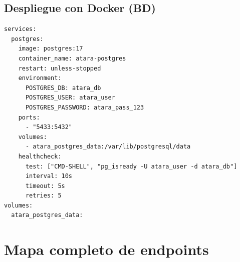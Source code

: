 \documentclass[11pt,a4paper,oneside]{article}
\newcommand{\code}[1]{\texttt{\small #1}}
\begin{document}
\subsection{Despliegue con Docker (BD)}

\begin{lstlisting}[style=bash,caption={\code{docker-compose.yml} de desarrollo}]
services:
  postgres:
    image: postgres:17
    container_name: atara-postgres
    restart: unless-stopped
    environment:
      POSTGRES_DB: atara_db
      POSTGRES_USER: atara_user
      POSTGRES_PASSWORD: atara_pass_123
    ports:
      - "5433:5432"
    volumes:
      - atara_postgres_data:/var/lib/postgresql/data
    healthcheck:
      test: ["CMD-SHELL", "pg_isready -U atara_user -d atara_db"]
      interval: 10s
      timeout: 5s
      retries: 5
volumes:
  atara_postgres_data:
\end{lstlisting}

\section{Mapa completo de endpoints}
\end{document}
